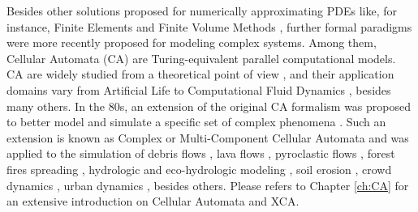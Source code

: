Besides other solutions proposed for numerically approximating PDEs like, for instance, Finite Elements \cite{Hutton:2003} and Finite Volume Methods \cite{Moukalled:2015}, further formal paradigms were more recently proposed for modeling complex systems. Among them, Cellular Automata (CA) \cite{vonNeumann:1966:TSA:1102024} are Turing-equivalent \cite{Codd:1968:CA:1098682, Cook2004} parallel computational models. CA are widely studied from a theoretical point of view \cite{Wolfram-1984, Langton-1990b, wolfram2002, Ninagawa201542}, and their application domains vary from  Artificial Life \cite{Langton-1986, Beer2004309} to Computational  Fluid Dynamics \cite{Frish&al-1986, McNamara&Zanetti-1988,Higuera&Jimenez-1989, Aidun2010439}, besides many others. In the 80s, an extension of the original CA formalism was proposed to better model and simulate a specific set of complex phenomena \cite{DiGregorio&Serra-1999}. Such an extension is known as Complex
or Multi-Component Cellular Automata and was applied to the simulation of debris flows \cite{D'Ambrosio2003545,avolio2013sciddica}, lava flows \cite{D'Ambrosio2012533,D'Ambrosio2012317, Oliverio2011271, D'Ambrosio2006452},
pyroclastic flows \cite{Avolio2006897, Crisci20051019}, forest fires spreading \cite{Arca2015, Avolio2014209}, hydrologic and eco-hydrologic modeling \cite{Mendicino2015128,	Ravazzani2011634, Cervarolo2010205}, soil erosion
\cite{D'Ambrosio200133}, crowd dynamics \cite{Luba2016, Was&al-2015,Was2014199}, urban dynamics \cite{Blecic2015}, besides others. 
Please refers to Chapter \ref{ch:CA} for an extensive introduction on Cellular Automata and XCA.

